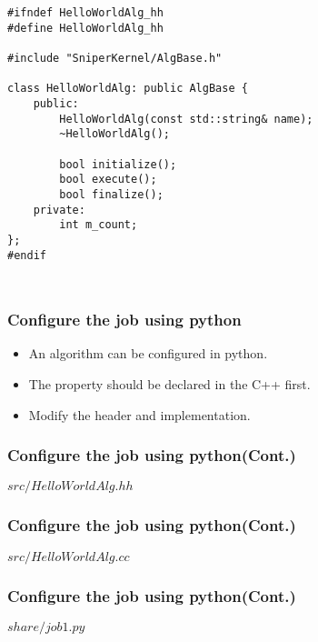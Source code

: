 \newsavebox{\createalgpropheader}
\begin{lrbox}{\createalgpropheader}
\begin{lstlisting}[linebackgroundcolor={\ifnum\value{lstnumber}=15\color{green}\fi}]
#ifndef HelloWorldAlg_hh
#define HelloWorldAlg_hh

#include "SniperKernel/AlgBase.h"

class HelloWorldAlg: public AlgBase {
    public:
        HelloWorldAlg(const std::string& name);
        ~HelloWorldAlg();

        bool initialize();
        bool execute();
        bool finalize();
    private:
        int m_count;
};
#endif
\end{lstlisting}
\end{lrbox}
\newsavebox{\createalgpropsrc}
\begin{lrbox}{\createalgpropsrc}
\begin{lstlisting}
\end{lstlisting}
\end{lrbox}
\newsavebox{\createalgproppy}
\begin{lrbox}{\createalgproppy}
\begin{lstlisting}
\end{lstlisting}
\end{lrbox}


\begin{frame}
    \frametitle{Configure the job using python}
    \begin{itemize}
        \item An algorithm can be configured in python.
        \item The property should be declared in the C++ first.
        \item Modify the header and implementation.
    \end{itemize}
\end{frame}

\begin{frame}
    \frametitle{Configure the job using python(Cont.)}
    \begin{block}{\(src/HelloWorldAlg.hh\)}
        \par\usebox{\createalgpropheader}
    \end{block}
\end{frame}
\begin{frame}
    \frametitle{Configure the job using python(Cont.)}
    \begin{block}{\(src/HelloWorldAlg.cc\)}
        \par\usebox{\createalgpropsrc}
    \end{block}
\end{frame}
\begin{frame}
    \frametitle{Configure the job using python(Cont.)}
    \begin{block}{\(share/job1.py\)}
        \par\usebox{\createalgproppy}
    \end{block}
\end{frame}
